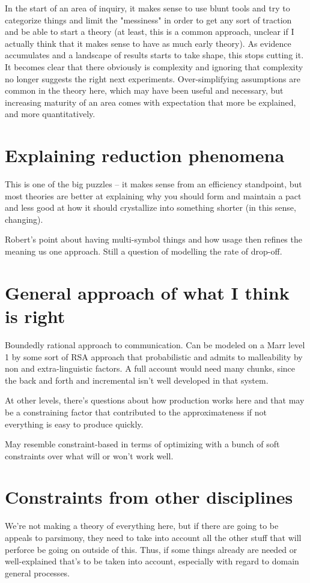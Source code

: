 \documentclass[]{article}
\begin{document}
In the start of an area of inquiry, it makes sense to use blunt tools and try to categorize things and limit the "messiness" in order to get any sort of traction and be able to start a theory (at least, this is a common approach, unclear if I actually think that it makes sense to have as much early theory). As evidence accumulates and a landscape of results starts to take shape, this stops cutting it. It becomes clear that there obviously is complexity and ignoring that complexity no longer suggests the right next experiments. Over-simplifying assumptions are common in the theory here, which may have been useful and necessary, but increasing maturity of an area comes with expectation that more be explained, and more quantitatively. 

\section{Explaining reduction phenomena}
This is one of the big puzzles -- it makes sense from an efficiency standpoint, but most theories are better at explaining why you should form and maintain a pact and less good at how it should crystallize into something shorter (in this sense, changing). 

Robert's point about having multi-symbol things and how usage then refines the meaning us one approach. Still a question of modelling the rate of drop-off. 

\section{General approach of what I think is right}
Boundedly rational approach to communication. Can be modeled on a Marr level 1 by some sort of RSA approach that probabilistic and admits to malleability by non and extra-linguistic factors. A full account would need many chunks, since the back and forth and incremental isn't well developed in that system. 

At other levels, there's questions about how production works here and that may be a constraining factor that contributed to the approximateness if not everything is easy to produce quickly. 

May resemble constraint-based in terms of optimizing with a bunch of soft constraints over what will or won't work well. 

\section{Constraints from other disciplines}
We're not making a theory of everything here, but if there are going to be appeals to parsimony, they need to take into account all the other stuff that will perforce be going on outside of this. Thus, if some things already are needed or well-explained that's to be  taken into account, especially with regard to domain general processes. 
\end{document}
